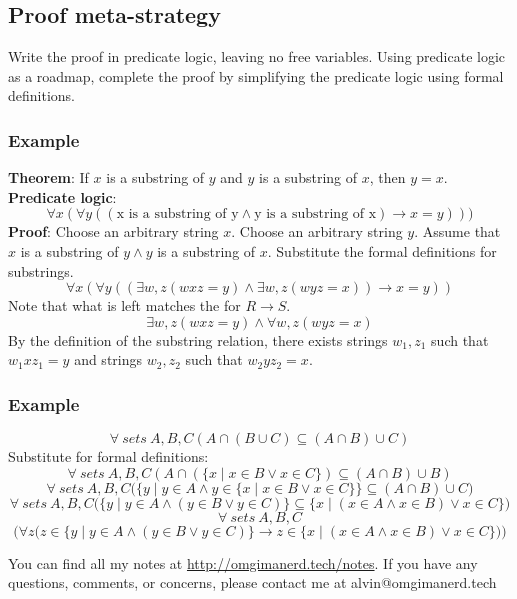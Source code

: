 \documentclass{math}
\begin{document}
\subsection*{Proof meta-strategy}
Write the proof in predicate logic, leaving no free variables. Using predicate
logic as a roadmap, complete the proof by simplifying the predicate logic
using formal definitions.

\subsubsection*{Example}
\textbf{Theorem}: If \( x \) is a substring of \( y \) and \( y \) is a
substring of \( x \), then \( y = x \). \\
\textbf{Predicate logic}:
\[ \forall{x}(\forall{y}((\text{x is a substring of y}\wedge\text{y is a
  substring of x})\to x = y))) \]
\textbf{Proof}: Choose an arbitrary string \( x \). Choose an arbitrary string
\( y \). Assume that \( x \) is a substring of \( y\wedge y \) is a substring of
\( x \). Substitute the formal definitions for substrings.
\[ \forall{x}(\forall{y}((\exists{w,z}(wxz = y)\wedge\exists{w,z}(wyz = x))\to
  x = y)) \]
Note that what is left matches the for \( R\to S \).
\[ \exists{w,z}(wxz = y)\wedge\forall{w,z}(wyz = x) \]
By the definition of the substring relation, there exists strings \( w_1,z_1 \)
such that \( w_1xz_1 = y \) and strings \( w_2,z_2 \) such that
\( w_2yz_2 = x \).

\subsubsection*{Example}
\[ \forall\ sets\ A,B,C (A \cap (B \cup C) \subseteq (A \cap B) \cup C) \]
Substitute for formal definitions:
\[ \forall\ sets\ A,B,C (A \cap (\{x\mid x\in B\vee x\in C\}) \subseteq
  (A \cap B) \cup B) \]
\[ \forall\ sets\ A,B,C \bigg(\big\{y\mid y\in A \wedge y\in\{x\mid x\in B\vee
  x\in C\}\big\} \subseteq (A \cap B) \cup C\bigg) \]
\[ \forall\ sets\ A,B,C \bigg(\big\{y\mid y\in A\wedge(y\in B\vee y\in
  C)\big\} \subseteq \big\{x\mid(x\in A\wedge x\in B)\vee x\in C\big\}\bigg) \]
\[ \forall\ sets\ A,B,C \]
\[ \Bigg(\forall{z}\bigg(z\in\big\{y\mid y\in A\wedge (y\in B\vee y\in
  C)\big\} \to z\in\big\{x\mid(x\in A\wedge x\in B)\vee x\in C\big\}\bigg)\Bigg)
\]
\begin{center}
  You can find all my notes at \url{http://omgimanerd.tech/notes}. If you have
  any questions, comments, or concerns, please contact me at
  alvin@omgimanerd.tech
\end{center}
\end{document}
